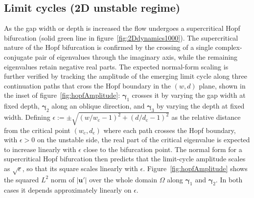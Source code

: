\documentclass[lineno]{jfm}
\begin{document}
\subsection{Limit cycles (2D unstable regime)}\label{sec:bifurcations}
As the gap width or depth is increased the flow undergoes a supercritical Hopf bifurcation (solid green line in figure~\ref{fig:2Ddynamics1000}). The supercritical nature of the Hopf bifurcation is confirmed by the crossing of a single complex-conjugate pair of eigenvalues through the imaginary axis, while the remaining eigenvalues retain negative real parts. The expected normal-form scaling is further verified by tracking the amplitude of the emerging limit cycle along three continuation paths that cross the Hopf boundary in the $(w,d)$ plane, shown in the inset of figure~\ref{fig:hopfAmplitude}: $\boldsymbol{\gamma}_1$ crosses it by varying the gap width at fixed depth, $\boldsymbol{\gamma}_2$ along an oblique direction, and $\boldsymbol{\gamma}_3$ by varying the depth at fixed width. Defining $\epsilon:=\pm\sqrt{(w/w_\mathrm{c}-1)^2+(d/d_\mathrm{c}-1)^2}$ as the relative distance from the critical point $(w_\mathrm{c},d_\mathrm{c})$ where each path crosses the Hopf boundary, with $\epsilon>0$ on the unstable side, the real part of the critical eigenvalue is expected to increase linearly with $\epsilon$ close to the bifurcation point. The normal form for a supercritical Hopf bifurcation then predicts that the limit-cycle amplitude scales as $\sqrt{\epsilon}$, so that its square scales linearly with $\epsilon$. Figure~\ref{fig:hopfAmplitude} shows the squared $L^2$ norm of $|\boldsymbol{u}'|$ over the whole domain $\Omega$ along $\boldsymbol{\gamma}_1$ and $\boldsymbol{\gamma}_2$. In both cases it depends approximately linearly on $\epsilon$.
\end{document}

